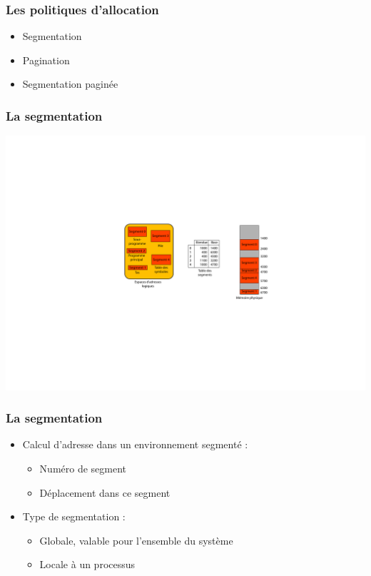 \begin{frame}
\frametitle{Les politiques d'allocation}
\begin{itemize}
\item Segmentation
\item Pagination
\item Segmentation paginée
\end{itemize}
\end{frame}


\begin{frame}
\frametitle{La segmentation}
\includegraphics[width=\textwidth]{../illustration/memoire_segment_exemple.pdf}
\end{frame}


\begin{frame}
\frametitle{La segmentation}
\begin{itemize}
\item Calcul d'adresse dans un environnement segmenté :
\begin{itemize}
\item Numéro de segment
\item Déplacement dans ce segment
\end{itemize}
\item Type de segmentation :
\begin{itemize}
\item Globale, valable pour l'ensemble du système
\item Locale à un processus
\end{itemize}
\end{itemize}
\end{frame}


